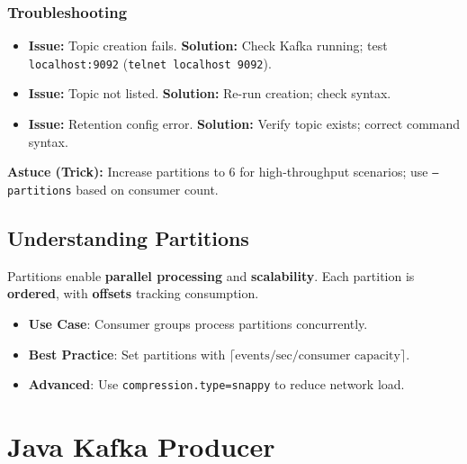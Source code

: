 \documentclass[12pt,a4paper]{report}
\begin{document}
\subsection{Troubleshooting}
\begin{itemize}
    \item \textbf{Issue:} Topic creation fails.
      \textbf{Solution:} Check Kafka running; test \texttt{localhost:9092} (\texttt{telnet localhost 9092}).
    \item \textbf{Issue:} Topic not listed.
      \textbf{Solution:} Re-run creation; check syntax.
    \item \textbf{Issue:} Retention config error.
      \textbf{Solution:} Verify topic exists; correct command syntax.
\end{itemize}

\begin{framed}
\textbf{Astuce (Trick):} Increase partitions to 6 for high-throughput scenarios; use \texttt{--partitions} based on consumer count.
\end{framed}

\section{Understanding Partitions}
Partitions enable \textbf{parallel processing} and \textbf{scalability}. Each partition is \textbf{ordered}, with \textbf{offsets} tracking consumption.

\begin{itemize}
    \item \textbf{Use Case}: Consumer groups process partitions concurrently.
    \item \textbf{Best Practice}: Set partitions with \(\lceil \text{events/sec} / \text{consumer capacity} \rceil\).
    \item \textbf{Advanced}: Use \texttt{compression.type=snappy} to reduce network load.
\end{itemize}

\chapter{Java Kafka Producer}
\end{document}
